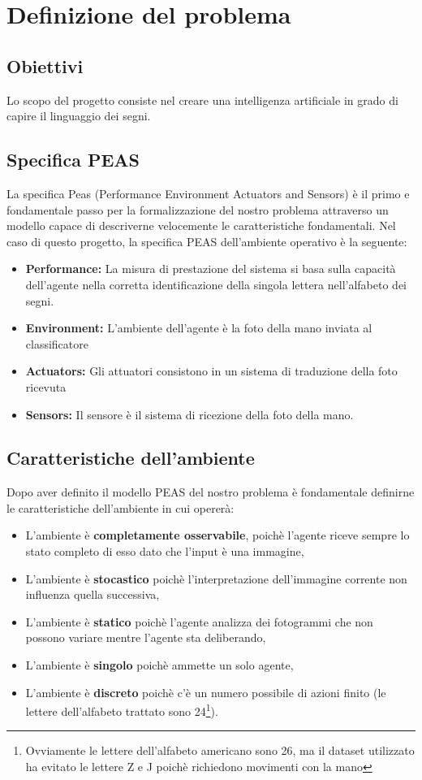 \documentclass{article}
\begin{document}
\newpage
\section{Definizione del problema}

\subsection{Obiettivi}
Lo scopo del progetto consiste nel creare una intelligenza artificiale in grado di capire il linguaggio dei segni.

\subsection{Specifica PEAS}
La specifica Peas (Performance Environment Actuators and Sensors) è il primo e fondamentale passo per la formalizzazione del nostro problema attraverso un modello capace di descriverne velocemente le caratteristiche fondamentali.
Nel caso di questo progetto, la specifica PEAS dell'ambiente operativo è la seguente:
\begin{itemize}
  \item \textbf{Performance:} La misura di prestazione del sistema si basa sulla capacità dell'agente nella corretta identificazione della singola lettera nell'alfabeto dei segni.
  \item \textbf{Environment:} L'ambiente dell'agente è la foto della mano inviata al classificatore
  \item \textbf{Actuators:} Gli attuatori consistono in un sistema di traduzione della foto ricevuta
  \item \textbf{Sensors:} Il sensore è il sistema di ricezione della foto della mano.
\end{itemize}

\subsection{Caratteristiche dell'ambiente}
Dopo aver definito il modello PEAS del nostro problema è fondamentale definirne le caratteristiche dell'ambiente in cui opererà:
\begin{itemize}
    \item L'ambiente è \textbf{completamente osservabile}, poichè l'agente riceve sempre lo stato completo di esso dato che l'input è una immagine,
    \item L'ambiente è \textbf{stocastico} poichè l'interpretazione dell'immagine corrente non influenza quella successiva,
    \item L'ambiente è \textbf{statico} poichè l'agente analizza dei fotogrammi che non possono variare mentre l'agente sta deliberando,
    \item L'ambiente è \textbf{singolo} poichè ammette un solo agente,
    \item L'ambiente è \textbf{discreto} poichè c'è un numero possibile di azioni finito (le lettere dell'alfabeto trattato sono 24\footnote{Ovviamente le lettere dell'alfabeto americano sono 26, ma il dataset utilizzato ha evitato le lettere Z e J poichè richiedono movimenti con la mano}).
\end{itemize}
\end{document}
